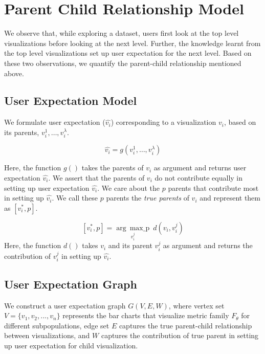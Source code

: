 \section{Parent Child Relationship Model} 
We observe that, while exploring a dataset, users first look at the top level visualizations before looking at the next level. Further, the knowledge learnt from the top level visualizations set up user expectation for the next level. Based on these two observations, we quantify the parent-child relationship mentioned above.  
  
\subsection{User Expectation Model}
We formulate user expectation ($\hat{v_i}$) corresponding to a visualization $v_i$, based on its parents, $v_i^1, \ldots, v_i^\lambda$. 
  
$$\hat{v_i} = g(v_i^1, \ldots, v_i^\lambda)$$

Here, the function $g()$ takes the parents of $v_i$ as argument and returns user expectation $\hat{v_i}$.
\newline
\newline
We assert that the parents of $v_i$ do not contribute equally in setting up user expectation $\hat{v_i}$. We care about the $p$ parents that contribute most in setting up $\hat{v_i}$. We call these $p$ parents the \emph{true parents} of $v_i$ and represent them as $[v_i^*, p]$. 
  
$$[v_i^*,p] = \underset{v_i^j}{\operatorname{arg\,\,\,max\_p}}\ d(v_i,v_i^j)$$
Here, the function $d()$ takes $v_i$ and its parent $v_i^j$ as argument and returns the contribution of $v_i^j$ in setting up $\hat{v_i}$. 
  
  
  
  \newline
  
  
  \iffalse
  
  \subsection{User Expectation Graph}
  We construct a user expectation graph $G(V, E, W)$, where vertex set $V = \{v_1, v_2, ..., v_n\}$ represents the bar charts that visualize metric family $F_\theta$ for different subpopulations, edge set $E$ captures the true parent-child relationship between visualizations, and $W$ captures the contribution of true parent in setting up user expectation for child visualization. 
  
